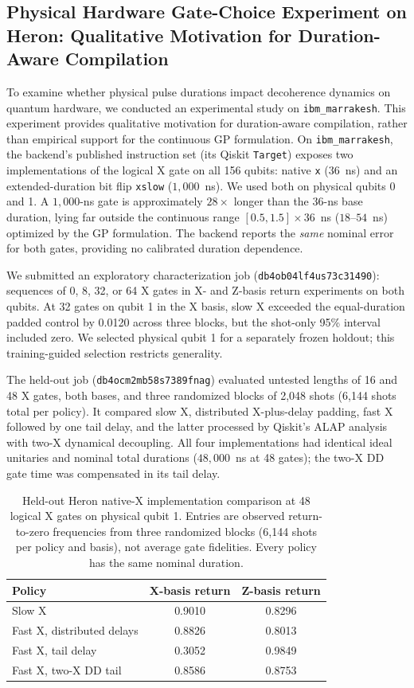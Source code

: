 \documentclass[10pt,letterpaper,journal]{IEEEtran}
\begin{document}
\subsection{Physical Hardware Gate-Choice Experiment on Heron: Qualitative Motivation for Duration-Aware Compilation}
To examine whether physical pulse durations impact decoherence dynamics on quantum hardware, we conducted an experimental study on \texttt{ibm\_marrakesh}. This experiment provides qualitative motivation for duration-aware compilation, rather than empirical support for the continuous GP formulation. On \texttt{ibm\_marrakesh}, the backend's published instruction set (its Qiskit \texttt{Target}) exposes two implementations of the logical X gate on all 156 qubits: native \texttt{x} ($36$~ns) and an extended-duration bit flip \texttt{xslow} ($1{,}000$~ns). We used both on physical qubits 0 and 1. A $1{,}000$-ns gate is approximately $28\times$ longer than the $36$-ns base duration, lying far outside the continuous range $[0.5, 1.5]\times 36$~ns ($18\text{--}54$~ns) optimized by the GP formulation. The backend reports the \emph{same} nominal error for both gates, providing no calibrated duration dependence.

We submitted an exploratory characterization job (\texttt{db4ob04lf4us73c31490}): sequences of 0, 8, 32, or 64 X gates in X- and Z-basis return experiments on both qubits. At 32 gates on qubit 1 in the X basis, slow X exceeded the equal-duration padded control by 0.0120 across three blocks, but the shot-only 95\% interval included zero. We selected physical qubit 1 for a separately frozen holdout; this training-guided selection restricts generality.

The held-out job (\texttt{db4ocm2mb58s7389fnag}) evaluated untested lengths of 16 and 48 X gates, both bases, and three randomized blocks of 2,048 shots (6,144 shots total per policy). It compared slow X, distributed X-plus-delay padding, fast X followed by one tail delay, and the latter processed by Qiskit's ALAP analysis with two-X dynamical decoupling. All four implementations had identical ideal unitaries and nominal total durations ($48{,}000$~ns at 48 gates); the two-X DD gate time was compensated in its tail delay.

\begin{table}[t]
\centering\caption{Held-out Heron native-X implementation comparison at 48 logical X gates on physical qubit 1. Entries are observed return-to-zero frequencies from three randomized blocks (6,144 shots per policy and basis), not average gate fidelities. Every policy has the same nominal duration.}\label{tab:x_duration_hardware}
\begin{tabular}{lcc}\hline
Policy & X-basis return & Z-basis return\\\hline
Slow X & 0.9010 & 0.8296\\
Fast X, distributed delays & 0.8826 & 0.8013\\
Fast X, tail delay & 0.3052 & 0.9849\\
Fast X, two-X DD tail & 0.8586 & 0.8753\\\hline
\end{tabular}
\end{table}
\end{document}
